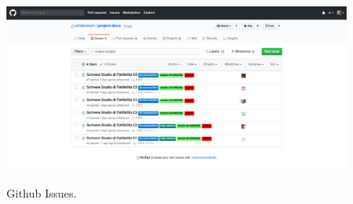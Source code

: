 \documentclass[../norme-di-progetto.tex]{subfiles}
\begin{document}
\begin{figure}[H]
  \centering
  \includegraphics[width=15cm]{img/issues.png}
  \label{fig:sheets}
  \caption{Github Issues.}
\end{figure}
\end{document}
